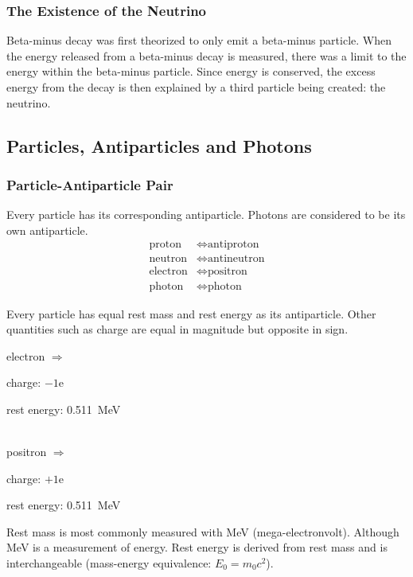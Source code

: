 \documentclass[10pt]{article}
\begin{document}
\begin{multicols*}{2}
	\subsubsection{The Existence of the Neutrino}
	Beta-minus decay was first theorized to only emit a beta-minus particle. When
	the energy released from a beta-minus decay is measured, there was a limit to
	the energy within the beta-minus particle. Since energy is conserved, the excess
	energy from the decay is then explained by a third particle being created: the
	neutrino.

	\subsection{Particles, Antiparticles and Photons}
	\subsubsection{Particle-Antiparticle Pair}
	Every particle has its corresponding antiparticle. Photons are considered to be
	its own antiparticle.
	\begin{align*}
		\text{proton}   & \Leftrightarrow \text{antiproton}
		\\
		\text{neutron}  & \Leftrightarrow \text{antineutron}
		\\
		\text{electron} & \Leftrightarrow \text{positron}
		\\
		\text{photon}   & \Leftrightarrow  \text{photon}
	\end{align*}

	Every particle has equal rest mass and rest energy as its antiparticle. Other quantities such as charge are equal in magnitude but opposite in sign.
	\begin{center}
		electron $\Rightarrow$ \begin{varwidth}{0.5\linewidth}
			charge: $-1$e \par
			rest energy: \qty{0.511}{\mega\electronvolt}
		\end{varwidth}
		\\[\medskipamount]
		positron $\Rightarrow$ \begin{varwidth}{0.5\linewidth}
			charge: $+1$e \par
			rest energy: \qty{0.511}{\mega\electronvolt}
		\end{varwidth}
	\end{center}
	Rest mass is most commonly measured with MeV (mega-electronvolt). Although MeV
	is a measurement of energy. Rest energy is derived from rest mass and is
	interchangeable (mass-energy equivalence: $E_0=m_0c^2$).


\end{multicols*}
\end{document}
